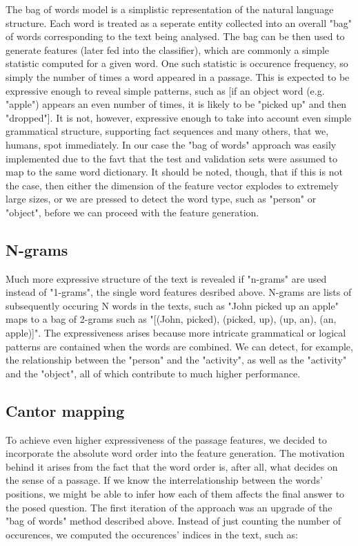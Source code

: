 \documentclass[a4paper]{article}
\numberwithin{equation}{section}
\begin{document}
The bag of words model is a simplistic representation of the natural language structure. Each word is treated as a seperate entity collected into an overall "bag" of words corresponding to the text being analysed. The bag can be then used to generate features (later fed into the classifier), which are commonly a simple statistic computed for a given word. One such statistic is occurence frequency, so simply the number of times a word appeared in a passage. This is expected to be expressive enough to reveal simple patterns, such as [if an object word (e.g. "apple") appears an even number of times, it is likely to be "picked up" and then "dropped"]. It is not, however, expressive enough to take into account even simple grammatical structure, supporting fact sequences and many others, that we, humans, spot immediately.
In our case the "bag of words" approach was easily implemented due to the favt that the test and validation sets were assumed to map to the same word dictionary. It should be noted, though, that if this is not the case, then either the dimension of the feature vector explodes to extremely large sizes, or we are pressed to detect the word type, such as "person" or "object", before we can proceed with the feature generation.

\subsection{N-grams}

Much more expressive structure of the text is revealed if "n-grams" are used instead of "1-grams", the single word features desribed above. N-grams are lists of subsequently occuring N words in the texts, such as "John picked up an apple" maps to a bag of 2-grams such as "[(John, picked), (picked, up), (up, an), (an, apple)]". The expressiveness arises because more intricate grammatical or logical patterns are contained when the words are combined. We can detect, for example, the relationship between the "person" and the "activity", as well as the "activity" and the "object", all of which contribute to much higher performance.

\subsection{Cantor mapping}

To achieve even higher expressiveness of the passage features, we decided to incorporate the absolute word order into the feature generation. The motivation behind it arises from the fact that the word order is, after all, what decides on the sense of a passage. If we know the interrelationship between the words' positions, we might be able to infer how each of them affects the final answer to the posed question.
The first iteration of the approach was an upgrade of the "bag of words" method described above. Instead of just counting the number of occurences, we computed the occurences' indices in the text, such as: \\
\end{document}
